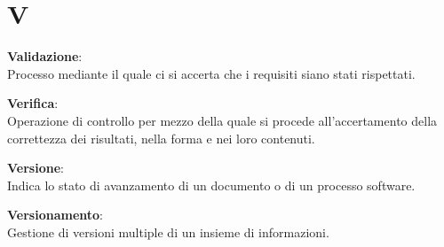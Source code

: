 \documentclass[a4paper, oneside, openany, dvipsnames, table]{article}
\begin{document}
\section{V}
\textbf{Validazione}:\\	Processo mediante il quale ci si accerta che i requisiti siano stati rispettati.

\textbf{Verifica}:\\	Operazione di controllo per mezzo della quale si procede all'accertamento della correttezza dei risultati, nella forma e nei loro contenuti.

\textbf{Versione}:\\ Indica lo stato di avanzamento di un documento o di un processo software.

\textbf{Versionamento}:\\	Gestione di versioni multiple di un insieme di informazioni.
\end{document}
